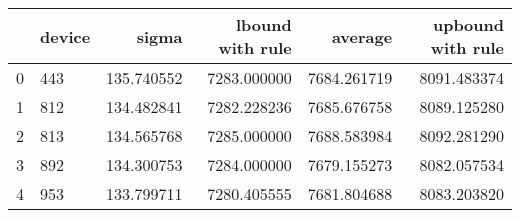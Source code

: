 \begin{tabular}{llrrrr}
\toprule
{} & device &       sigma &  lbound with rule &      average &  upbound with rule \\
\midrule
0 &    443 &  135.740552 &       7283.000000 &  7684.261719 &        8091.483374 \\
1 &    812 &  134.482841 &       7282.228236 &  7685.676758 &        8089.125280 \\
2 &    813 &  134.565768 &       7285.000000 &  7688.583984 &        8092.281290 \\
3 &    892 &  134.300753 &       7284.000000 &  7679.155273 &        8082.057534 \\
4 &    953 &  133.799711 &       7280.405555 &  7681.804688 &        8083.203820 \\
\bottomrule
\end{tabular}
